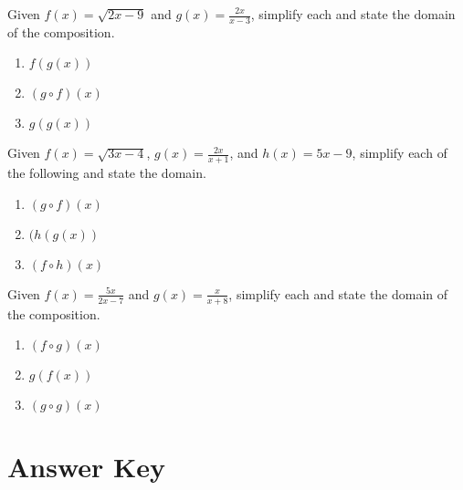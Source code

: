 Given $f(x) = \sqrt{2x-9}$ and $g(x) = \frac{2x}{x-3}$, simplify each and state the domain of the composition.

\begin{multicols}{3}
\begin{enumerate}	\setcounter{enumi}{\value{Review}}  
    \item $f(g(x))$
    \item $(g \circ f)(x)$
    \item $g(g(x))$
\end{enumerate}		\setcounter{Review}{\value{enumi}}
\end{multicols}

Given $f(x) = \sqrt{3x-4}$, $g(x) = \frac{2x}{x+1}$, and $h(x) = 5x-9$, simplify each of the following and state the domain.
\begin{multicols}{3}
\begin{enumerate}   \setcounter{enumi}{\value{Review}}
    \item $(g \circ f)(x)$
    \item $(h(g(x))$
    \item $(f \circ h)(x)$
\end{enumerate}     \setcounter{Review}{\value{enumi}}
\end{multicols}

Given $f(x) = \frac{5x}{2x-7}$ and $g(x) = \frac{x}{x+8}$, simplify each and state the domain of the composition.
\begin{multicols}{3}
\begin{enumerate}   \setcounter{enumi}{\value{Review}}
\item $(f \circ g)(x)$
\item  $g(f(x))$
\item  $(g \circ g)(x)$
\end{enumerate}     \setcounter{Review}{\value{enumi}}
\end{multicols}

\newpage

\section{Answer Key}

